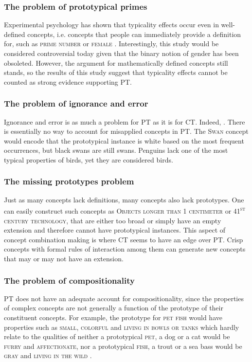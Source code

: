 \subsubsection*{The problem of prototypical primes}
Experimental psychology has shown that typicality effects occur even in well-defined concepts, i.e. concepts that people can immediately provide a definition for, such as \textsc{prime number} or \textsc{female} \citep{Armstrong1983}. Interestingly, this study would be considered controversial today given that the binary notion of gender has been obsoleted. However, the argument for mathematically defined concepts still stands, so the results of this study suggest that typicality effects cannot be counted as strong evidence supporting PT. 

\subsubsection*{The problem of ignorance and error}\label{sec:the-problem-of-ignorance-and-error}
Ignorance and error is as much a problem for PT as it is for CT. Indeed, . There is essentially no way to account for misapplied concepts in PT. The \textsc{Swan} concept would encode that the prototypical instance is white based on the most frequent occurrences, but black swans are still swans. Penguins lack one of the most typical properties of birds, yet they are considered birds.

\subsubsection*{The missing prototypes problem}\label{sec:the-missing-prototypes-problem}
Just as many concepts lack definitions, many concepts also lack prototypes. One can easily construct such concepts as \textsc{Objects longer than 1 centimeter} or \textsc{41\textsuperscript{st} century technology}, that are either too broad or simply have an empty extension and therefore cannot have prototypical instances. This aspect of concept combination making is where CT seems to have an edge over PT. Crisp concepts with formal rules of interaction among them can generate new concepts that may or may not have an extension.

\subsubsection*{The problem of compositionality}\label{sec:the-problem-of-compositionality}
PT does not have an adequate account for compositionality, since the properties of complex concepts are not generally a function of the prototype of their constituent concepts. For example, the prototype for \textsc{pet fish} would have properties such as \textsc{small}, \textsc{colorful} and \textsc{living in bowls or tanks} which hardly relate to the qualities of neither a prototypical \textsc{pet}, a dog or a cat would be \textsc{furry} and \textsc{affectionate}, nor a prototypical \textsc{fish}, a trout or a sea bass would be \textsc{gray} and \textsc{living in the wild} \citep{Osherson1981}.

